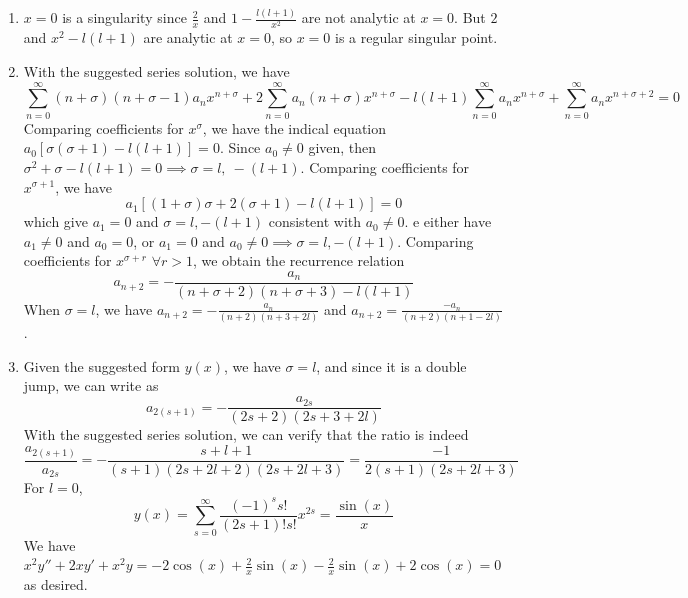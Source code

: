 \documentclass[a4paper]{article}
\begin{document}
\begin{ans}\leavevmode
\begin{enumerate}[label=(\roman*)]
\item $x=0$ is a singularity since $\frac{2}{x}$ and $1-\frac{l(l+1)}{x^2}$ are not analytic at $x=0$. But $2$ and $x^2-l(l+1)$ are analytic at $x=0$, so $x=0$ is a regular singular point.
\item With the suggested series solution, we have
$$\sum_{n=0}^\infty (n+\sigma)(n+\sigma-1)a_nx^{n+\sigma}+2\sum_{n=0}^\infty a_n(n+\sigma)x^{n+\sigma}-l(l+1)\sum_{n=0}^\infty a_nx^{n+\sigma}+\sum_{n=0}^\infty a_nx^{n+\sigma+2}=0$$
Comparing coefficients for $x^\sigma$, we have the indical equation $a_0[\sigma(\sigma+1)-l(l+1)]=0$. Since $a_0\neq0$ given, then  $\sigma^2+\sigma-l(l+1)=0\implies\sigma=l,~-(l+1)$. Comparing coefficients for $x^{\sigma+1}$, we have
$$a_1[(1+\sigma)\sigma+2(\sigma+1)-l(l+1)]=0$$
which give $a_1=0$ and $\sigma=l,-(l+1)$ consistent with $a_0\neq 0$. e either have $a_1\neq0$ and $a_0=0$, or $a_1=0$ and $a_0\neq0\implies \sigma=l,-(l+1)$. Comparing coefficients for $x^{\sigma+r}$ $\forall r>1$, we obtain the recurrence relation
$$a_{n+2}=-\frac{a_n}{(n+\sigma+2)(n+\sigma+3)-l(l+1)}$$
When $\sigma=l$, we have $a_{n+2}=-\frac{a_n}{(n+2)(n+3+2l)}$ and $a_{n+2}=\frac{-a_n}{(n+2)(n+1-2l)}$.
\item Given the suggested form $y(x)$, we have $\sigma=l$, and since it is a double jump, we can write as
$$a_{2(s+1)}=-\frac{a_{2s}}{(2s+2)(2s+3+2l)}$$
With the suggested series solution, we can verify that the ratio is indeed $$\frac{a_{2(s+1)}}{a_{2s}}=-\frac{s+l+1}{(s+1)(2s+2l+2)(2s+2l+3)}=\frac{-1}{2(s+1)(2s+2l+3)}$$
For $l=0$, 
$$y(x)=\sum_{s=0}^\infty\frac{(-1)^ss!}{(2s+1)!s!}x^{2s}=\frac{\sin(x)}{x}$$
We have $x^2y''+2xy'+x^2y=-2\cos(x)+\frac{2}{x}\sin(x)-\frac{2}{x}\sin(x)+2\cos(x)=0$ as desired.
\end{enumerate}
\end{ans}
\newpage
\end{document}
